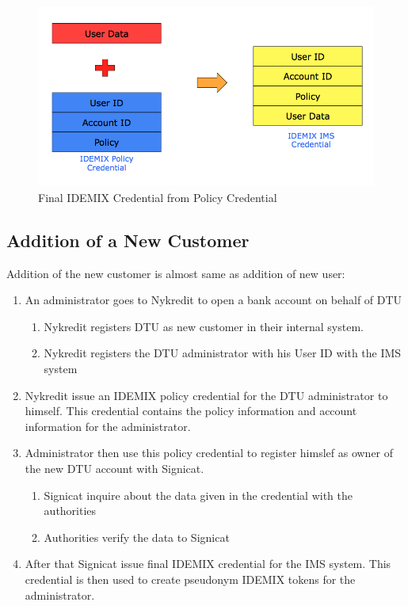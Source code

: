 \begin{figure}[h]
	\centering
	\includegraphics[width=\textwidth]{figures/Final}
	\caption{Final IDEMIX Credential from Policy Credential}
	\label{fig:Final}
\end{figure}
\FloatBarrier
\subsection{Addition of a New Customer}
Addition of the new customer is almost same as addition of new user:
\begin{enumerate}
	\item An administrator goes to Nykredit to open a bank account on behalf of DTU 
	\begin{enumerate}
		\item Nykredit registers DTU as new customer in their internal system.
		\item Nykredit registers the DTU administrator with his User ID with the IMS system
	\end{enumerate}
	\item Nykredit issue an IDEMIX policy credential for the  DTU administrator to himself. This credential contains the policy information and account information for the administrator.
	\item Administrator then use this policy credential to register himslef as owner of the new DTU account with Signicat. 
	\begin{enumerate}
		\item Signicat inquire about the data given in the credential with the authorities
		\item Authorities verify the data to Signicat
	\end{enumerate}
	\item After that Signicat issue final IDEMIX credential for the IMS system. This credential is then used to create pseudonym IDEMIX tokens for the administrator. 
\end{enumerate}
